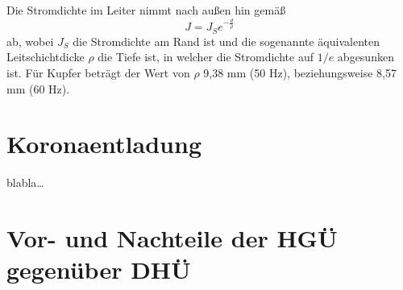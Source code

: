 \documentclass[10pt,a4paper]{article}
\begin{document}
Die Stromdichte im Leiter nimmt nach außen hin gemäß
\begin{equation}
J = J_S e^{-\frac{d}{\rho}}
\end{equation}
ab, wobei $J_S$ die Stromdichte am Rand ist und die sogenannte äquivalenten Leitschichtdicke $\rho$ die Tiefe ist, in welcher die Stromdichte auf $1/e$ abgesunken ist. Für Kupfer beträgt der Wert von $\rho$ 9,38 mm (50 Hz), beziehungsweise 8,57 mm (60 Hz).

\section{Koronaentladung}
blabla…

\section{Vor- und Nachteile der HGÜ gegenüber DHÜ}
\end{document}
